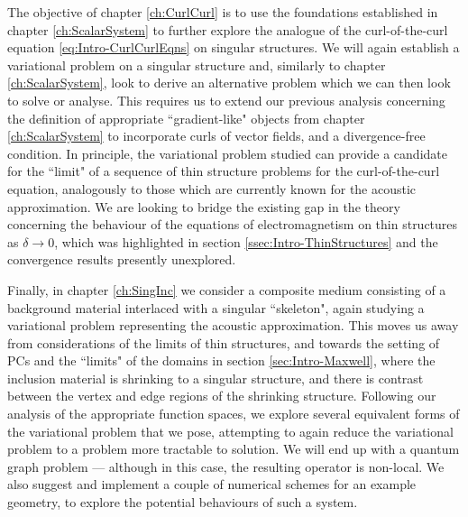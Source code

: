 The objective of chapter \ref{ch:CurlCurl} is to use the foundations established in chapter \ref{ch:ScalarSystem} to further explore the analogue of the curl-of-the-curl equation \eqref{eq:Intro-CurlCurlEqns} on singular structures.
We will again establish a variational problem on a singular structure and, similarly to chapter \ref{ch:ScalarSystem}, look to derive an alternative problem which we can then look to solve or analyse.
This requires us to extend our previous analysis concerning the definition of appropriate ``gradient-like" objects from chapter \ref{ch:ScalarSystem} to incorporate curls of vector fields, and a divergence-free condition.
In principle, the variational problem studied can provide a candidate for the ``limit" of a sequence of thin structure problems for the curl-of-the-curl equation, analogously to those which are currently known for the acoustic approximation.
We are looking to bridge the existing gap in the theory concerning the behaviour of the equations of electromagnetism on thin structures as $\delta\rightarrow0$, which was highlighted in section \ref{ssec:Intro-ThinStructures} and the convergence results presently unexplored.

Finally, in chapter \ref{ch:SingInc} we consider a composite medium consisting of a background material interlaced with a singular ``skeleton", again studying a variational problem representing the acoustic approximation.
This moves us away from considerations of the limits of thin structures, and towards the setting of PCs and the ``limits" of the domains in section \ref{sec:Intro-Maxwell}, where the inclusion material is shrinking to a singular structure, and there is contrast between the vertex and edge regions of the shrinking structure.
Following our analysis of the appropriate function spaces, we explore several equivalent forms of the variational problem that we pose, attempting to again reduce the variational problem to a problem more tractable to solution. 
We will end up with a quantum graph problem --- although in this case, the resulting operator is non-local.
We also suggest and implement a couple of numerical schemes for an example geometry, to explore the potential behaviours of such a system.